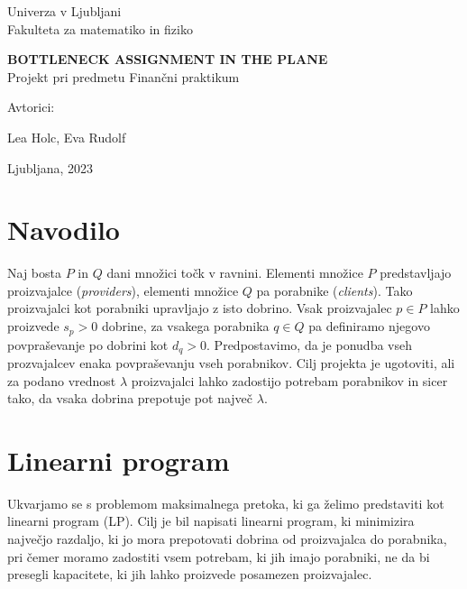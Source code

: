 \documentclass[a4paper, 11pt]{article}
\begin{document}
\thispagestyle{empty}
\begin{center}
\begin{minipage}{0.75\linewidth}
    \centering
    {\Large Univerza v Ljubljani \\ Fakulteta za matematiko in fiziko}
    \\
    \vspace{7cm}

    {\uppercase{\LARGE \textbf{Bottleneck assignment in the plane}}} \\ Projekt pri predmetu Finančni praktikum \\
    \vspace{3cm}

    Avtorici:\\
    {\Large Lea Holc, Eva Rudolf\par}
    \vspace{7cm}

    {\Large Ljubljana, 2023}
\end{minipage}
\end{center}


\newpage
\tableofcontents
\newpage
\section{Navodilo}
Naj bosta $P$ in $Q$ dani množici točk v ravnini. Elementi množice $P$ predstavljajo proizvajalce 
(\textsl{providers}), elementi množice $Q$ pa porabnike (\textsl{clients}). Tako proizvajalci kot porabniki 
upravljajo z isto dobrino. Vsak proizvajalec $p \in P$ lahko proizvede $s_p > 0$ dobrine, za vsakega porabnika 
$q \in Q$ pa definiramo njegovo povpraševanje po dobrini kot $d_q > 0$. Predpostavimo, da je ponudba vseh 
prozvajalcev enaka povpraševanju vseh porabnikov. Cilj projekta je ugotoviti, ali za podano vrednost $\lambda$ 
proizvajalci lahko zadostijo potrebam porabnikov in sicer tako, da vsaka dobrina prepotuje pot največ $\lambda$. 

\section{Linearni program}
Ukvarjamo se s problemom maksimalnega pretoka, ki ga želimo predstaviti kot linearni program (LP).
Cilj je bil napisati linearni program, ki minimizira največjo razdaljo, ki jo mora prepotovati dobrina 
od proizvajalca do porabnika, pri čemer moramo zadostiti vsem potrebam, ki jih imajo porabniki, ne da 
bi presegli kapacitete, ki jih lahko proizvede posamezen proizvajalec. 
\end{document}
